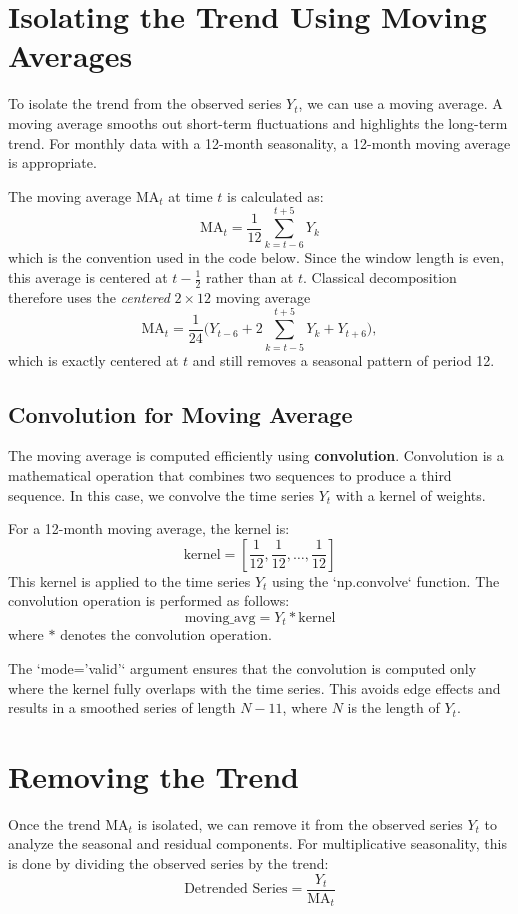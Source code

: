 \begin{notechapter}
\section{Isolating the Trend Using Moving Averages}

To isolate the trend from the observed series \( Y_t \), we can use a
moving average. A moving average smooths out short-term fluctuations
and highlights the long-term trend. For monthly data with a 12-month
seasonality, a 12-month moving average is appropriate.

The moving average \( \text{MA}_t \) at time \( t \) is calculated as:
\[
\text{MA}_t = \frac{1}{12} \sum_{k=t-6}^{t+5} Y_k
\]
which is the convention used in the code below. Since the window length is even, this average is centered at $t - \tfrac{1}{2}$ rather than at $t$. Classical decomposition therefore uses the \emph{centered} $2\times 12$ moving average
\[
\text{MA}_t = \frac{1}{24}\Big(Y_{t-6} + 2\sum_{k=t-5}^{t+5} Y_k + Y_{t+6}\Big),
\]
which is exactly centered at $t$ and still removes a seasonal pattern of period 12.

\subsection{Convolution for Moving Average}
The moving average is computed efficiently using \textbf{convolution}.
Convolution is a mathematical operation that combines two sequences to
produce a third sequence. In this case, we convolve the time series
\( Y_t \) with a kernel of weights.

For a 12-month moving average, the kernel is:
\[
\text{kernel} = \left[\frac{1}{12}, \frac{1}{12}, \dots, \frac{1}{12}\right]
\]
This kernel is applied to the time series \( Y_t \) using the
`np.convolve` function. The convolution operation is performed as
follows:
\[
\text{moving\_avg} = Y_t \ast \text{kernel}
\]
where \( \ast \) denotes the convolution operation.

The `mode='valid'` argument ensures that the convolution is computed
only where the kernel fully overlaps with the time series.
This avoids edge effects and results in a smoothed series of
length \( N - 11 \), where \( N \) is the length of \( Y_t \).

\section{Removing the Trend}

Once the trend \( \text{MA}_t \) is isolated, we can remove it from
the observed series \( Y_t \) to analyze the seasonal and residual
components. For multiplicative seasonality, this is done by dividing
the observed series by the trend:
\[
\text{Detrended Series} = \frac{Y_t}{\text{MA}_t}
\]


\end{notechapter}
